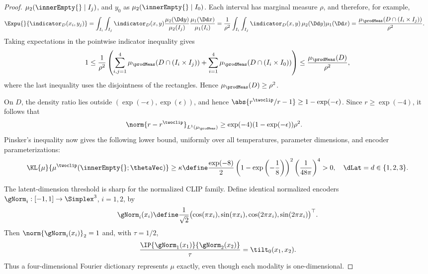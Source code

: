 \documentclass{article}
\begin{document}
\begin{proof}
 $\mu_2(\innerEmpty{}\mid I_j)$, and $y_0$ as
 $\mu_2(\innerEmpty{}\mid I_0)$. Each interval has marginal measure
 $\rho$, and therefore, for example,
 \begin{align*}
  \Expu{}{\indicator_D(x_i,y_j)}
   & =\int_{I_i}\int_{I_j}\indicator_D(x,y)
  \frac{\mu_2(\Dd y)}{\mu_2(I_j)}
  \frac{\mu_1(\Dd x)}{\mu_1(I_i)}
  =\frac{1}{\rho^2}
  \int_{I_i}\int_{I_j}\indicator_D(x,y)\,
  \mu_2(\Dd y)\mu_1(\Dd x)
  =\frac{\mu_\prodMeas(D\cap(I_i\times I_j))}{\rho^2}.
 \end{align*}
 Taking expectations in the pointwise indicator inequality gives
 \begin{align*}
  1 \leq\frac{1}{\rho^2}
  \left(
  \sum_{i,j=1}^4\mu_\prodMeas(D\cap(I_i\times I_j))
  +\sum_{i=1}^4\mu_\prodMeas(D\cap(I_i\times I_0))
  \right)
  \leq\frac{\mu_\prodMeas(D)}{\rho^2},
 \end{align*}
 where the last inequality uses the disjointness of the rectangles. Hence
 $\mu_\prodMeas(D)\geq\rho^2$.

 On $D$, the density ratio lies outside $(\exp(-\epsilon),\exp(\epsilon))$,
 and hence $\abs{r^{\twoclip}/r-1}\geq1-\exp(-\epsilon)$. Since
 $r\geq\exp(-4)$, it follows that
 \begin{align*}
  \norm{r-r^{\twoclip}}_{L^1(\mu_\prodMeas)}
   & \geq\exp(-4)(1-\exp(-\epsilon))\rho^2.
 \end{align*}
 Pinsker's inequality now gives the following lower bound, uniformly over all
 temperatures, parameter dimensions, and encoder parameterizations:
 \begin{align*}
  \KL{\mu}{\mu^{\twoclip}(\innerEmpty{};\thetaVec)}
  \geq\kappa
  \define\frac{\exp(-8)}{2}
  \left(1-\exp\left(-\frac18\right)\right)^2
  \left(\frac{1}{48\pi}\right)^4>0,
  \quad \dLat=d\in\{1,2,3\}.
 \end{align*}

 The latent-dimension threshold is sharp for the normalized CLIP family.
 Define identical normalized encoders $\gNorm_i:[-1,1]\to\Simplex^3$,
 $i=1,2$, by
 \begin{align*}
  \gNorm_i(x_i)\define\frac{1}{\sqrt{2}}
  \bigl(\cos(\pi x_i),\sin(\pi x_i),
  \cos(2\pi x_i),\sin(2\pi x_i)\bigr)^\top.
 \end{align*}
 Then $\norm{\gNorm_i(x_i)}_2=1$ and, with $\tau=1/2$,
 \begin{align*}
  \frac{\IP{\gNorm_1(x_1)}{\gNorm_2(x_2)}}{\tau}
  =\tilt_0(x_1,x_2).
 \end{align*}
 Thus a four-dimensional Fourier dictionary represents $\mu$ exactly,
 even though each modality is one-dimensional.
\end{proof}
\end{document}
